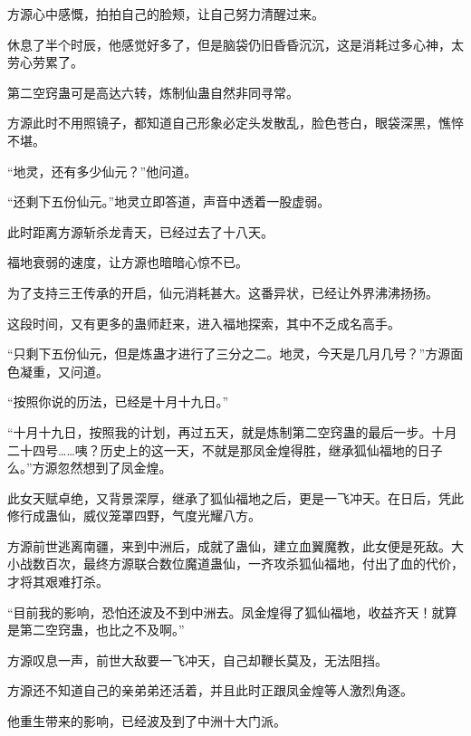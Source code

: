 \begin{this_body}
方源心中感慨，拍拍自己的脸颊，让自己努力清醒过来。

休息了半个时辰，他感觉好多了，但是脑袋仍旧昏昏沉沉，这是消耗过多心神，太劳心劳累了。

第二空窍蛊可是高达六转，炼制仙蛊自然非同寻常。

方源此时不用照镜子，都知道自己形象必定头发散乱，脸色苍白，眼袋深黑，憔悴不堪。

“地灵，还有多少仙元？”他问道。

“还剩下五份仙元。”地灵立即答道，声音中透着一股虚弱。

此时距离方源斩杀龙青天，已经过去了十八天。

福地衰弱的速度，让方源也暗暗心惊不已。

为了支持三王传承的开启，仙元消耗甚大。这番异状，已经让外界沸沸扬扬。

这段时间，又有更多的蛊师赶来，进入福地探索，其中不乏成名高手。

“只剩下五份仙元，但是炼蛊才进行了三分之二。地灵，今天是几月几号？”方源面色凝重，又问道。

“按照你说的历法，已经是十月十九日。”

“十月十九日，按照我的计划，再过五天，就是炼制第二空窍蛊的最后一步。十月二十四号……咦？历史上的这一天，不就是那凤金煌得胜，继承狐仙福地的日子么。”方源忽然想到了凤金煌。

此女天赋卓绝，又背景深厚，继承了狐仙福地之后，更是一飞冲天。在日后，凭此修行成蛊仙，威仪笼罩四野，气度光耀八方。

方源前世逃离南疆，来到中洲后，成就了蛊仙，建立血翼魔教，此女便是死敌。大小战数百次，最终方源联合数位魔道蛊仙，一齐攻杀狐仙福地，付出了血的代价，才将其艰难打杀。

“目前我的影响，恐怕还波及不到中洲去。凤金煌得了狐仙福地，收益齐天！就算是第二空窍蛊，也比之不及啊。”

方源叹息一声，前世大敌要一飞冲天，自己却鞭长莫及，无法阻挡。

方源还不知道自己的亲弟弟还活着，并且此时正跟凤金煌等人激烈角逐。

他重生带来的影响，已经波及到了中洲十大门派。

\end{this_body}

